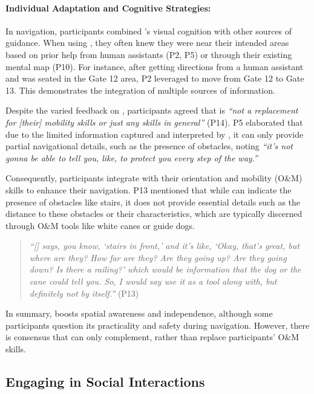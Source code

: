 \paragraph{Individual Adaptation and Cognitive Strategies:}


In navigation, participants combined \bma's visual cognition with other sources of guidance. When using \bma, they often knew they were near their intended areas based on prior help from human assistants (P2, P5) or through their existing mental map (P10). For instance, after getting directions from a human assistant and was seated in the Gate 12 area, P2 leveraged \bma{} to move from Gate 12 to Gate 13. This demonstrates the integration of multiple sources of information.  


Despite the varied feedback on \bma, participants agreed that \bma{} is \textit{``not a replacement for [their] mobility skills or just any skills in general''} (P14). P5 elaborated that due to the limited information captured and interpreted by \bma, it can only provide partial navigational details, such as the presence of obstacles, noting \textit{``it's not gonna be able to tell you, like, to protect you every step of the way.''} 


Consequently, participants integrate \bma{} with their orientation and mobility (O\&M) skills to enhance their navigation. P13 mentioned that while \bma{} can indicate the presence of obstacles like stairs, it does not provide essential details such as the distance to these obstacles or their characteristics, which are typically discerned through O\&M tools like white canes or guide dogs.


\begin{quote}
    \textit{``[\bma] says, you know, `stairs in front,' and it's like, `Okay, that's great, but where are they? How far are they? Are they going up? Are they going down? Is there a railing?' which would be information that the dog or the cane could tell you. So, I would say use it as a tool along with, but definitely not by itself.''} (P13)
\end{quote}


In summary, \bma{} boosts spatial awareness and independence, although some participants question its practicality and safety during navigation. However, there is consensus that \bma{} can only complement, rather than replace participants' O\&M skills. 


\subsection{Engaging in Social Interactions}

